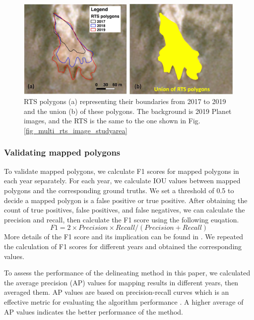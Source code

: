\documentclass[authoryear,preprint,review,12pt]{elsarticle}
\begin{document}
\begin{figure} 
	\centering
	\includegraphics[width=14cm]{figs/rts_expanding_example_trim}
	\caption{RTS polygons (a) representing their boundaries from 2017 to 2019 and the union (b) of these polygons. The background is 2019 Planet images, and the RTS is the same to the one shown in Fig. \ref{fig_multi_rts_image_studyarea}}
	\label{fig_rts_expanding}
\end{figure}


\subsubsection{Validating mapped polygons}
\label{sec_validate_mapped_polygons}

To validate mapped polygons, we calculate F1 scores \citep{huang2020using} for mapped polygons in each year separately. 
For each  year, we calculate IOU values between mapped polygons and the corresponding ground truths. 
We set a threshold of 0.5 to decide a mapped polygon is a false positive or true positive.
After obtaining the count of true positives, false positives, and false negatives, we can calculate the precision and recall, then calculate the F1 score using the following euqation. 
\begin{equation}
F1=2 \times Precision \times Recall / (Precision + Recall)
\label{equ_f1score}
\end{equation}
More details of the F1 score and its implication can be found in \cite{huang2020using}.
We repeated the calculation of F1 scores for different years and obtained the corresponding values. 

To assess the performance of the delineating method in this paper, we calculated the average precision (AP) values for mapping results in different years, then averaged them. 
AP values are based on precision-recall curves which is an effective metric for evaluating the algorithm performance \citep{huang2020using}.
A higher average of AP values indicates the better performance of the method. 
\end{document}
